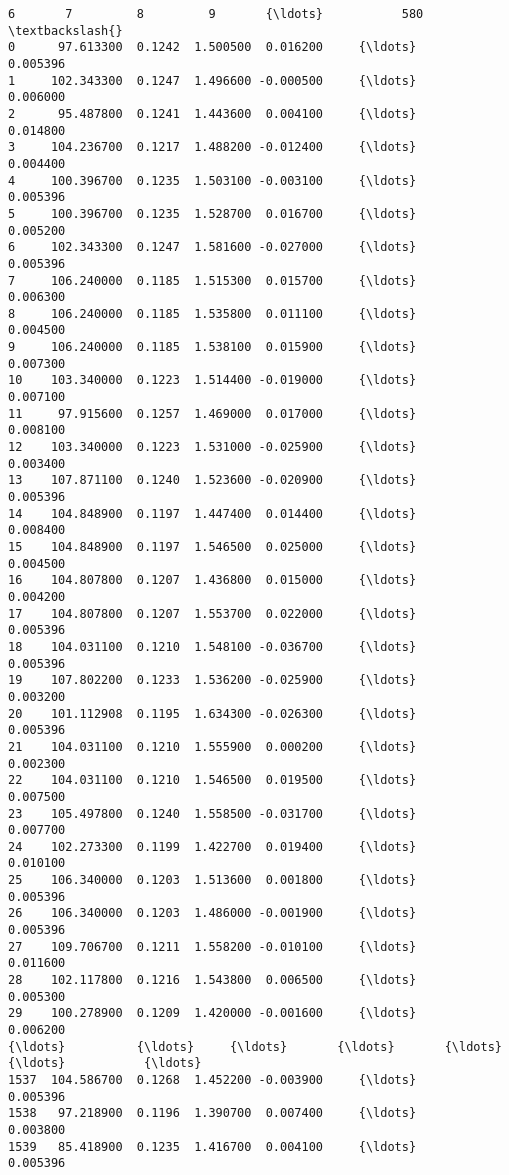 \documentclass[11pt]{article}
\begin{document}
\begin{Verbatim}[commandchars=\\\{\}]
             6       7         8         9       {\ldots}           580  \textbackslash{}
0      97.613300  0.1242  1.500500  0.016200     {\ldots}      0.005396   
1     102.343300  0.1247  1.496600 -0.000500     {\ldots}      0.006000   
2      95.487800  0.1241  1.443600  0.004100     {\ldots}      0.014800   
3     104.236700  0.1217  1.488200 -0.012400     {\ldots}      0.004400   
4     100.396700  0.1235  1.503100 -0.003100     {\ldots}      0.005396   
5     100.396700  0.1235  1.528700  0.016700     {\ldots}      0.005200   
6     102.343300  0.1247  1.581600 -0.027000     {\ldots}      0.005396   
7     106.240000  0.1185  1.515300  0.015700     {\ldots}      0.006300   
8     106.240000  0.1185  1.535800  0.011100     {\ldots}      0.004500   
9     106.240000  0.1185  1.538100  0.015900     {\ldots}      0.007300   
10    103.340000  0.1223  1.514400 -0.019000     {\ldots}      0.007100   
11     97.915600  0.1257  1.469000  0.017000     {\ldots}      0.008100   
12    103.340000  0.1223  1.531000 -0.025900     {\ldots}      0.003400   
13    107.871100  0.1240  1.523600 -0.020900     {\ldots}      0.005396   
14    104.848900  0.1197  1.447400  0.014400     {\ldots}      0.008400   
15    104.848900  0.1197  1.546500  0.025000     {\ldots}      0.004500   
16    104.807800  0.1207  1.436800  0.015000     {\ldots}      0.004200   
17    104.807800  0.1207  1.553700  0.022000     {\ldots}      0.005396   
18    104.031100  0.1210  1.548100 -0.036700     {\ldots}      0.005396   
19    107.802200  0.1233  1.536200 -0.025900     {\ldots}      0.003200   
20    101.112908  0.1195  1.634300 -0.026300     {\ldots}      0.005396   
21    104.031100  0.1210  1.555900  0.000200     {\ldots}      0.002300   
22    104.031100  0.1210  1.546500  0.019500     {\ldots}      0.007500   
23    105.497800  0.1240  1.558500 -0.031700     {\ldots}      0.007700   
24    102.273300  0.1199  1.422700  0.019400     {\ldots}      0.010100   
25    106.340000  0.1203  1.513600  0.001800     {\ldots}      0.005396   
26    106.340000  0.1203  1.486000 -0.001900     {\ldots}      0.005396   
27    109.706700  0.1211  1.558200 -0.010100     {\ldots}      0.011600   
28    102.117800  0.1216  1.543800  0.006500     {\ldots}      0.005300   
29    100.278900  0.1209  1.420000 -0.001600     {\ldots}      0.006200   
{\ldots}          {\ldots}     {\ldots}       {\ldots}       {\ldots}     {\ldots}           {\ldots}   
1537  104.586700  0.1268  1.452200 -0.003900     {\ldots}      0.005396   
1538   97.218900  0.1196  1.390700  0.007400     {\ldots}      0.003800   
1539   85.418900  0.1235  1.416700  0.004100     {\ldots}      0.005396   

\end{Verbatim}
\end{document}
